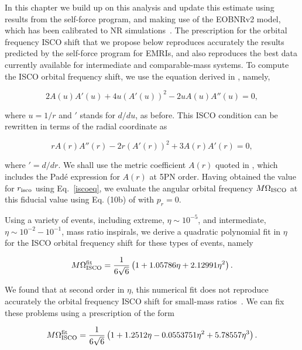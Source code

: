 \noindent In this chapter we build up on this analysis and update this estimate using results from the self-force program, and making use of the EOBNRv2 model, which has been calibrated to NR simulations~\cite{BuonannoEOBv2Main}. The prescription for the orbital frequency ISCO shift that we propose below reproduces accurately the results predicted by the self-force program for EMRIs, and also reproduces the best data currently available for intermediate and comparable-mass systems.  To compute the ISCO orbital frequency shift, we use the equation derived in \cite{damsh}, namely,


\begin{equation}
2A(u)A'(u) + 4u\left(A'(u)\right)^2 - 2uA(u)A''(u)=0,
\label{damisco}
\end{equation}

\noindent where \(u=1/r\) and \('\) stands for \(d/du\), as before. 
This ISCO condition can be rewritten in terms of the radial coordinate as \cite{favata}

\begin{equation}
rA(r)A''(r) -2r\left(A'(r)\right)^2 +3A(r)A'(r)=0,
\label{iscoeq}
\end{equation}

\noindent where \('=d/dr\). We shall use the metric coefficient \(A(r)\) quoted in \cite{BuonannoEOBv2Main}, which includes the Pad\'e expression for \(A(r)\) at 5PN order.  Having obtained the value for \(r_{\rm  isco}\) using Eq.~\eqref{iscoeq}, we evaluate the angular orbital frequency  \(M\Omega_{\rm ISCO}\) at  this fiducial value using Eq. (10b) of \cite{BuonannoEOBv2Main} with \(p_r =0\). 

Using a variety of events, including extreme, \(\eta\sim 10^{-5}\), and intermediate, \(\eta\sim 10^{-2}-10^{-1}\), mass ratio inspirals, we derive a quadratic polynomial fit  in \(\eta\) for the ISCO orbital frequency shift for these types of events, namely

\begin{equation}
M\Omega^{\rm fit}_{\rm ISCO} = \frac{1}{6\sqrt{6}}\left(1+1.05786\eta + 2.12991\eta ^2\right).
\label{newshift}
\end{equation}

\noindent We found that at second order in \(\eta\), this numerical fit does not reproduce accurately the orbital frequency ISCO shift for small-mass ratios~\cite{inner}. We can fix these problems using a prescription of the form

\begin{equation}
M\Omega^{\rm fit}_{\rm ISCO} = \frac{1}{6\sqrt{6}}\left(1 + 1.2512\eta - 0.0553751\eta^2 + 5.78557\eta^3\right).
\label{comisco}
\end{equation}

